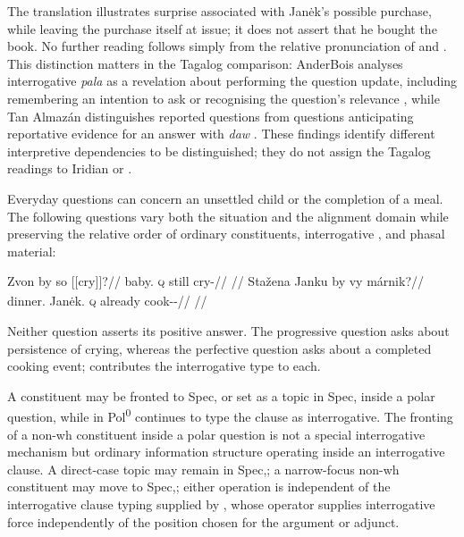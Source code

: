 The translation illustrates surprise associated with Janėk's possible
purchase, while leaving the purchase itself at issue; it does not assert that
he bought the book. No further reading follows simply from the relative
pronunciation of  and . This distinction matters in the
Tagalog comparison: AnderBois analyses interrogative \textit{pala} as a
revelation about performing the question update, including remembering an
intention to ask or recognising the question's relevance
\cite[§5.2]{anderbois2023pala}, while Tan Almazán distinguishes reported
questions from questions anticipating reportative evidence for an answer
with \textit{daw} \cite[§4.3.4]{tanalmazan2019}. These findings identify
different interpretive dependencies to be distinguished; they do not assign
the Tagalog readings to Iridian  or .

Everyday questions can concern an unsettled child or the completion of a
meal. The following questions vary both the situation and the alignment
domain while preserving the relative order of ordinary constituents, interrogative , and phasal material:

\pex\label{ex:question-slot-workshop}
\a
\begingl
\gla Zvon by so \textnormal{[[cry]]}\textsubscript{\Prog{}}?//
\glb baby.\Dir{} \textsc{q} still cry-\Prog{}//
\glft {}
//
\endgl
\a
\begingl
\gla Stažena Janku by vy márnik?//
\glb dinner.\Dir{} Janėk.\Trs{} \textsc{q} already cook-\Trs{}-\Pf{}//
\glft {}
//
\endgl
\xe

Neither question asserts its positive answer. The progressive question asks
about persistence of crying, whereas the perfective question asks about a
completed cooking event;  contributes the interrogative type to each.

A constituent may be fronted to Spec, or set as a topic in
Spec, inside a polar question, while  in
Pol\textsuperscript{0} continues to type the clause as interrogative. The
fronting of a non-wh constituent inside a polar question is not a special
interrogative mechanism but ordinary information structure operating inside an
interrogative clause. A direct-case topic may remain in Spec,; a
narrow-focus non-wh constituent may move to Spec,; either
operation is independent of the interrogative clause typing supplied by
, whose operator supplies interrogative force independently of the
position chosen for the argument or adjunct.


